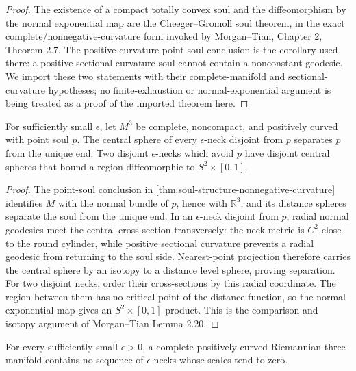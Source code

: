 \begin{proof}
The existence of a compact totally convex soul and the diffeomorphism by the
normal exponential map are the Cheeger--Gromoll soul theorem, in the exact
complete/nonnegative-curvature form invoked by Morgan--Tian, Chapter 2,
Theorem 2.7.  The positive-curvature point-soul conclusion is the corollary
used there: a positive sectional curvature soul cannot contain a nonconstant
geodesic.  We import these two statements with their complete-manifold and
sectional-curvature hypotheses; no finite-exhaustion or normal-exponential
argument is being treated as a proof of the imported theorem here.
\end{proof}

\begin{lemma}
\label{lem:positive-curvature-neck-separation}
\notready
For sufficiently small $\epsilon$, let $M^3$ be complete, noncompact, and
positively curved with point soul $p$.  The central sphere of every
$\epsilon$-neck disjoint from $p$ separates $p$ from the unique end.  Two
disjoint $\epsilon$-necks which avoid $p$ have disjoint central spheres that
bound a region diffeomorphic to $S^2\times[0,1]$.
\end{lemma}

\begin{proof}
The point-soul conclusion in
\ref{thm:soul-structure-nonnegative-curvature} identifies $M$ with the normal
bundle of $p$, hence with $\mathbb R^3$, and its distance spheres separate the
soul from the unique end.  In an $\epsilon$-neck disjoint from $p$, radial
normal geodesics meet the central cross-section transversely: the neck metric
is $C^2$-close to the round cylinder, while positive sectional curvature
prevents a radial geodesic from returning to the soul side.  Nearest-point
projection therefore carries the central sphere by an isotopy to a distance
level sphere, proving separation.  For two disjoint necks, order their
cross-sections by this radial coordinate.  The region between them has no
critical point of the distance function, so the normal exponential map gives
an $S^2\times[0,1]$ product.  This is the comparison and isotopy argument of
Morgan--Tian Lemma 2.20.
\end{proof}

\begin{proposition}
\label{prop:positive-curvature-neck-scale-lower-bound}
\notready
For every sufficiently small $\epsilon>0$, a complete positively curved
Riemannian three-manifold contains no sequence of $\epsilon$-necks whose
scales tend to zero.
\end{proposition}

